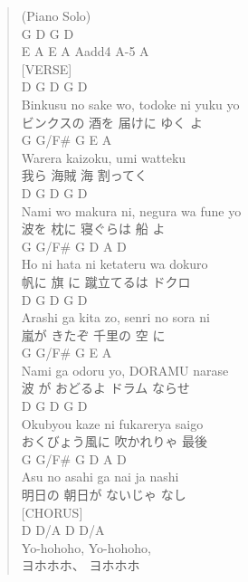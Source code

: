 \documentclass[11pt]{article}
\begin{document}
\begin{verse}
(Piano Solo)\\
G       D       G       D\\
E       A       E       A   Aadd4   A-5   A\\
\vspace*{1em}
\vspace*{1em}
[VERSE]\\
D          G        D         G    D\\
Binkusu no sake wo, todoke ni yuku yo\\
ビンクスの   酒を     届けに     ゆく  よ\\
G   G/F\# G        E        A\\
Warera   kaizoku, umi watteku\\
我ら      海賊     海   割ってく\\
D         G        D         G    D\\
Nami wo makura ni, negura wa fune yo\\
波を      枕に      寝ぐらは    船   よ\\
G     G/F\# G        D     A   D\\
Ho ni hata ni ketateru wa dokuro\\
帆に   旗   に  蹴立てるは   ドクロ\\
\vspace*{1em}
D         G        D        G    D\\
Arashi ga kita zo, senri no sora ni\\
嵐が       きたぞ    千里の    空   に\\
G    G/F\# G          E        A\\
Nami ga  odoru yo, DORAMU narase\\
波   が  おどるよ    ドラム   ならせ\\
D       G       D         G  D\\
Okubyou kaze ni fukarerya saigo\\
おくびょう風に    吹かれりゃ  最後\\
G   G/F\# G       D   A    D\\
Asu no  asahi ga nai ja nashi\\
明日の   朝日が    ないじゃ なし\\
\vspace*{1em}
\vspace*{1em}
[CHORUS]\\
D       D/A     D      D/A\\
Yo-hohoho, Yo-hohoho,\\
ヨホホホ、    ヨホホホ\\

\end{verse}
\end{document}
